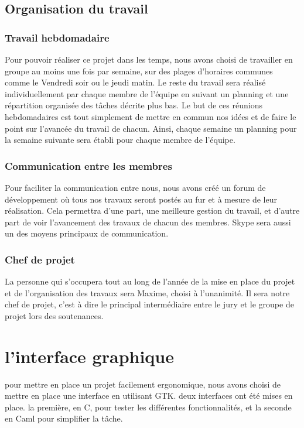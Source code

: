 \documentclass{report}
\begin{document}
\section{Organisation du travail} %
		\subsection{Travail hebdomadaire}

Pour pouvoir réaliser ce projet dans les temps, nous avons choisi de travailler en groupe au moins une fois par semaine, sur des plages d'horaires communes comme le Vendredi soir ou le jeudi matin. Le reste du travail sera réalisé individuellement par chaque membre de l'équipe en suivant un planning et une répartition organisée des tâches décrite plus bas. Le but de ces réunions hebdomadaires est tout simplement de mettre en commun nos idées et de faire le point sur l'avancée du travail de chacun. Ainsi, chaque semaine un planning pour la semaine suivante sera établi pour chaque membre de l'équipe.

		\subsection{Communication entre les membres} %

Pour faciliter la communication entre nous, nous avons créé un forum de développement
o\`u tous nos travaux seront postés au fur et \`a  mesure de leur réalisation. Cela permettra d'une part, une meilleure gestion du travail, et d'autre part de voir l'avancement des travaux de chacun des membres. Skype sera aussi un des moyens principaux de communication.

		\subsection{Chef de projet}

La personne qui s'occupera tout au long de l'année de la mise en place du projet
et de l'organisation des travaux sera Maxime, choisi à l'unanimité. Il sera notre chef de projet, c'est à dire le principal intermédiaire entre le jury et le groupe de projet lors des soutenances.

\chapter{l'interface graphique}
pour mettre en place un projet facilement ergonomique, nous avons choisi de mettre en place une interface en utilisant GTK. deux interfaces ont été mises en place. la première, en C, pour tester les différentes fonctionnalités, et la seconde en Caml pour simplifier la tâche.
\end{document}
